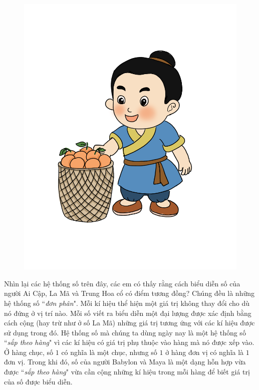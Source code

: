 		\begin{figure}
		\centering
		\vspace*{-35pt}
		\captionsetup{labelformat= empty, justification=centering}
		\includegraphics[width=1\linewidth]{20.12-pi.3}
		\vspace*{-50pt}
	\end{figure}
	Nhìn lại các hệ thống số trên đây, các em có thấy rằng cách biểu diễn số của người Ai Cập, La Mã và Trung Hoa cổ có điểm tương đồng? Chúng đều là những hệ thống số ``\textit{đơn phân}". Mỗi kí hiệu thể hiện một giá trị không thay đổi cho dù nó đứng ở vị trí nào. Mỗi số viết ra biểu diễn một đại lượng được xác định bằng cách  cộng (hay trừ như ở số La Mã) những giá trị tương ứng với các kí hiệu được sử dụng trong đó. Hệ thống số mà chúng ta dùng ngày nay là một hệ thống số ``\textit{sắp theo hàng}" vì các kí hiệu có giá trị phụ thuộc vào hàng mà nó được xếp vào. Ở hàng chục, số $1$ có nghĩa là một chục, nhưng số $1$ ở hàng đơn vị có nghĩa là $1$ đơn vị. Trong khi đó, số của người Babylon và Maya là một dạng hỗn hợp vừa được ``\textit{sắp theo hàng}" vừa cần cộng những kí hiệu trong mỗi hàng để biết giá trị của số được biểu diễn.
